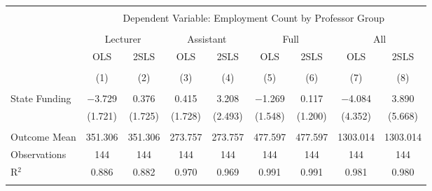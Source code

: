 
\begin{tabular}{@{\extracolsep{5pt}}lcccccccc} 
\\[-1.8ex]\hline 
\hline \\[-1.8ex] 
 & \multicolumn{8}{c}{Dependent Variable: Employment Count by Professor Group} \\ 
\cline{2-9} 
\\[-1.8ex] & \multicolumn{2}{c}{Lecturer} & \multicolumn{2}{c}{Assistant} & \multicolumn{2}{c}{Full} & \multicolumn{2}{c}{All} \\ 
 & OLS & 2SLS & OLS & 2SLS & OLS & 2SLS & OLS & 2SLS \\ 
\\[-1.8ex] & (1) & (2) & (3) & (4) & (5) & (6) & (7) & (8)\\ 
\hline \\[-1.8ex] 
 State Funding & $-$3.729 & 0.376 & 0.415 & 3.208 & $-$1.269 & 0.117 & $-$4.084 & 3.890 \\ 
  & (1.721) & (1.725) & (1.728) & (2.493) & (1.548) & (1.200) & (4.352) & (5.668) \\ 
 \hline \\[-1.8ex] 
Outcome Mean & 351.306 & 351.306 & 273.757 & 273.757 & 477.597 & 477.597 & 1303.014 & 1303.014 \\ 
Observations & 144 & 144 & 144 & 144 & 144 & 144 & 144 & 144 \\ 
R$^{2}$ & 0.886 & 0.882 & 0.970 & 0.969 & 0.991 & 0.991 & 0.981 & 0.980 \\ 
\hline 
\hline \\[-1.8ex] 
\end{tabular} 
